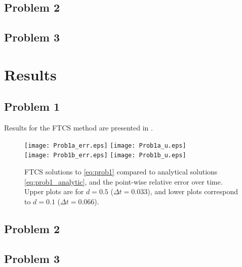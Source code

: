 \documentclass[11pt]{article}
\begin{document}
\subsection{Problem 2}

\subsection{Problem 3}

\section{Results} %

\subsection{Problem 1}

Results for the FTCS method are presented in .

\begin{figure}[h!]
\begin{center}
\texttt{[image: Prob1a\_err.eps]}
\hspace*{-0.2cm}
\texttt{[image: Prob1a\_u.eps]}
\\
\texttt{[image: Prob1b\_err.eps]}
\hspace*{-0.2cm}
\texttt{[image: Prob1b\_u.eps]}
\\[-0.5cm]
\caption{FTCS solutions to \eqref{eq:prob1} compared to analytical solutions \eqref{eq:prob1_analytic}, and the point-wise relative error over time. Upper plots are for $d=0.5$ ($\Delta t = 0.033$), and lower plots correspond to $d=0.1$ ($\Delta t = 0.066$).}
\label{fig:Prob1}
\end{center}
\end{figure}

\subsection{Problem 2}

\subsection{Problem 3}
\end{document}
